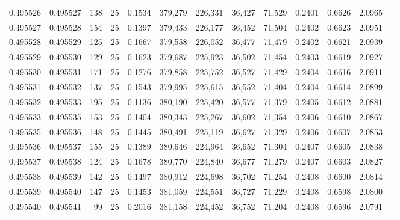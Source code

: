 \begin{tabular}{rrrrrrrrrrrrr}
0.495526 & 0.495527 &   138 &  25 &                                     0.1534 & 379,279 & 226,331 &  36,427 &  71,529 & 0.2401 & 0.6626 & 2.0965 \\
0.495527 & 0.495528 &   154 &  25 &                                     0.1397 & 379,433 & 226,177 &  36,452 &  71,504 & 0.2402 & 0.6623 & 2.0951 \\
0.495528 & 0.495529 &   125 &  25 &                                     0.1667 & 379,558 & 226,052 &  36,477 &  71,479 & 0.2402 & 0.6621 & 2.0939 \\
0.495529 & 0.495530 &   129 &  25 &                                     0.1623 & 379,687 & 225,923 &  36,502 &  71,454 & 0.2403 & 0.6619 & 2.0927 \\
0.495530 & 0.495531 &   171 &  25 &                                     0.1276 & 379,858 & 225,752 &  36,527 &  71,429 & 0.2404 & 0.6616 & 2.0911 \\
0.495531 & 0.495532 &   137 &  25 &                                     0.1543 & 379,995 & 225,615 &  36,552 &  71,404 & 0.2404 & 0.6614 & 2.0899 \\
0.495532 & 0.495533 &   195 &  25 &                                     0.1136 & 380,190 & 225,420 &  36,577 &  71,379 & 0.2405 & 0.6612 & 2.0881 \\
0.495533 & 0.495535 &   153 &  25 &                                     0.1404 & 380,343 & 225,267 &  36,602 &  71,354 & 0.2406 & 0.6610 & 2.0867 \\
0.495535 & 0.495536 &   148 &  25 &                                     0.1445 & 380,491 & 225,119 &  36,627 &  71,329 & 0.2406 & 0.6607 & 2.0853 \\
0.495536 & 0.495537 &   155 &  25 &                                     0.1389 & 380,646 & 224,964 &  36,652 &  71,304 & 0.2407 & 0.6605 & 2.0838 \\
0.495537 & 0.495538 &   124 &  25 &                                     0.1678 & 380,770 & 224,840 &  36,677 &  71,279 & 0.2407 & 0.6603 & 2.0827 \\
0.495538 & 0.495539 &   142 &  25 &                                     0.1497 & 380,912 & 224,698 &  36,702 &  71,254 & 0.2408 & 0.6600 & 2.0814 \\
0.495539 & 0.495540 &   147 &  25 &                                     0.1453 & 381,059 & 224,551 &  36,727 &  71,229 & 0.2408 & 0.6598 & 2.0800 \\
0.495540 & 0.495541 &    99 &  25 &                                     0.2016 & 381,158 & 224,452 &  36,752 &  71,204 & 0.2408 & 0.6596 & 2.0791 \\

\end{tabular}
